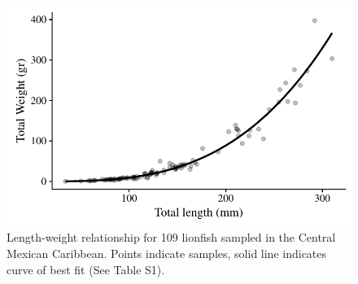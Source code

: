 \documentclass[fleqn,10pt,lineno]{wlpeerj} %
\begin{document}
\begin{figure}
\centering
\includegraphics{Manuscript_files/figure-latex/unnamed-chunk-4-1.pdf}
\caption{\label{fig:unnamed-chunk-4}\label{fig:l-w-carib}Length-weight
relationship for 109 lionfish sampled in the Central Mexican Caribbean.
Points indicate samples, solid line indicates curve of best fit (See
Table S1).}
\end{figure}
\end{document}
